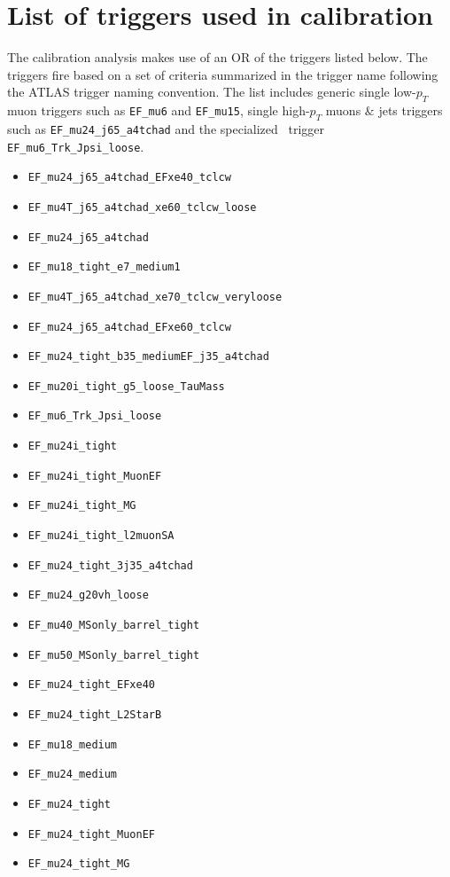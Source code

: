 \chapter{List of triggers used in calibration}\label{app:CalibrationTrigger}
The calibration analysis makes use of an OR of the triggers listed below. The triggers fire based on a set of criteria summarized in the trigger name following the ATLAS trigger naming convention.
The list includes generic single low-$p_{T}$ muon triggers such as \verb|EF_mu6| and \verb|EF_mu15|, single high-$p_{T}$ muons $\&$ jets triggers such as \verb|EF_mu24_j65_a4tchad| and the specialized \jpsi\ trigger \verb|EF_mu6_Trk_Jpsi_loose|.

\begin{itemize}
\item \verb|EF_mu24_j65_a4tchad_EFxe40_tclcw|
\item \verb|EF_mu4T_j65_a4tchad_xe60_tclcw_loose|
\item \verb|EF_mu24_j65_a4tchad|
\item \verb|EF_mu18_tight_e7_medium1|
\item \verb|EF_mu4T_j65_a4tchad_xe70_tclcw_veryloose|
\item \verb|EF_mu24_j65_a4tchad_EFxe60_tclcw|
\item \verb|EF_mu24_tight_b35_mediumEF_j35_a4tchad|
\item \verb|EF_mu20i_tight_g5_loose_TauMass|
\item \verb|EF_mu6_Trk_Jpsi_loose|
\item \verb|EF_mu24i_tight|
\item \verb|EF_mu24i_tight_MuonEF|
\item \verb|EF_mu24i_tight_MG|
\item \verb|EF_mu24i_tight_l2muonSA|
\item \verb|EF_mu24_tight_3j35_a4tchad|
\item \verb|EF_mu24_g20vh_loose|
\item \verb|EF_mu40_MSonly_barrel_tight|
\item \verb|EF_mu50_MSonly_barrel_tight|
\item \verb|EF_mu24_tight_EFxe40|
\item \verb|EF_mu24_tight_L2StarB|
\item \verb|EF_mu18_medium|
\item \verb|EF_mu24_medium|
\item \verb|EF_mu24_tight|
\item \verb|EF_mu24_tight_MuonEF|
\item \verb|EF_mu24_tight_MG|

\end{itemize}

